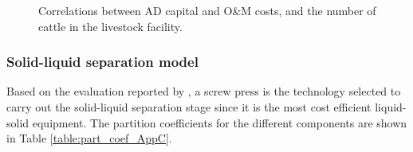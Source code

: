 \begin{refsection}[referencesCh4]
\begin{figure}[h!]
	\caption{Correlations between AD capital and O\&M costs, and the number of cattle in the livestock facility.}
	\label{fig:AD_size_2cost_AppC}
\end{figure}

\subsubsection{Solid-liquid separation model}
Based on the evaluation reported by \citet{MollerSLsep}, a screw press is the technology selected to carry out the solid-liquid separation stage since it is the most cost efficient liquid-solid equipment. The partition coefficients for the different components are shown in Table \ref{table:part_coef_AppC}.
\begin{table}[h] 
		\centering
		\caption{Partition coefficients for solid-liquid manure separation using a screw press unit \protect\citep{MollerSLsep}} \label{table:part_coef_AppC}
\end{table}


\end{refsection}

